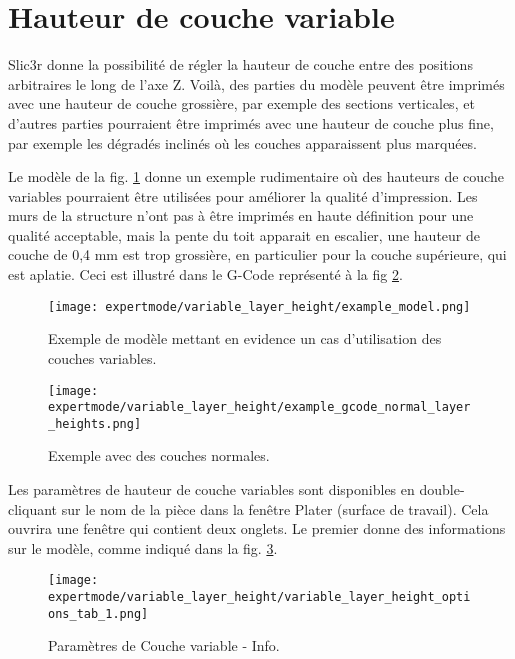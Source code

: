 
\section{Hauteur de couche variable} %
\label{sec:variable_layer_height}

Slic3r donne la possibilité de régler la hauteur de couche entre des positions arbitraires le long de l'axe Z. Voilà, des parties du modèle peuvent être imprimés avec une hauteur de couche grossière, par exemple des sections verticales, et d'autres parties pourraient être imprimés avec une hauteur de couche plus fine, par exemple les dégradés inclinés où les couches apparaissent plus marquées.

Le modèle de la fig. \ref{fig:example_model} donne un exemple rudimentaire où des hauteurs de couche variables pourraient être utilisées pour améliorer la qualité d'impression.  Les murs de la structure n'ont pas à être imprimés en haute définition pour une qualité acceptable, mais la pente du toit apparait en escalier, une hauteur de couche de 0,4 mm est trop grossière, en particulier pour la couche supérieure, qui est aplatie.  Ceci est illustré dans le G-Code représenté à la fig \ref{fig:example_gcode_normal_layer_heights}.


\begin{figure}[H]
\centering
\texttt{[image: expertmode/variable\_layer\_height/example\_model.png]}
\caption{Exemple de modèle mettant en evidence un cas d'utilisation des couches variables.}
\label{fig:example_model}
\end{figure}

\begin{figure}[H]
\centering
\texttt{[image: expertmode/variable\_layer\_height/example\_gcode\_normal\_layer\_heights.png]}
\caption{Exemple avec des couches normales.}
\label{fig:example_gcode_normal_layer_heights}
\end{figure}

Les paramètres de hauteur de couche variables sont disponibles en double-cliquant sur ​​le nom de la pièce dans la fenêtre Plater (surface de travail).  Cela ouvrira une fenêtre qui contient deux onglets. Le premier donne des informations sur le modèle, comme indiqué dans la fig. \ref{fig:variable_layer_height_options_tab_1}.

\begin{figure}[H]
\centering
\texttt{[image: expertmode/variable\_layer\_height/variable\_layer\_height\_options\_tab\_1.png]}
\caption{Paramètres de Couche variable - Info.}
\label{fig:variable_layer_height_options_tab_1}
\end{figure}

